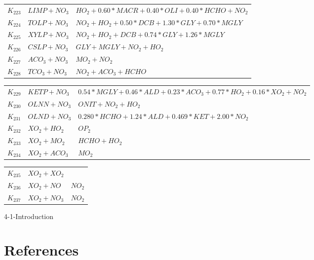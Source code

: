 {\begin{tabular}{l@{\,:\,}p{0.2\chfwidth}@{$\quad\longrightarrow\quad$}p{0.6\chfwidth}}
$K_{223}$ & $LIMP+NO_{3}$ & $HO_{2}+0.60*MACR+0.40*OLI+0.40*HCHO+NO_{2}$ \\
$K_{224}$ & $TOLP+NO_{3}$ & $NO_{2}+HO_{2}+0.50*DCB+1.30*GLY+0.70*MGLY$ \\
$K_{225}$ & $XYLP+NO_{3}$ & $NO_{2}+HO_{2}+DCB+0.74*GLY+1.26*MGLY$ \\
$K_{226}$ & $CSLP+NO_{3}$ & $GLY+MGLY+NO_{2}+HO_{2}$ \\
$K_{227}$ & $ACO_{3}+NO_{3}$ & $MO_{2}+NO_{2}$ \\
$K_{228}$ & $TCO_{3}+NO_{3}$ & $NO_{2}+ACO_{3}+HCHO$ \\
\end{tabular}

\begin{tabular}{l@{\,:\,}p{0.2\chfwidth}@{$\quad\longrightarrow\quad$}p{0.6\chfwidth}}
$K_{229}$ & $KETP+NO_{3}$ & $0.54*MGLY+0.46*ALD+0.23*ACO_{3}+0.77*HO_{2}+0.16*XO_{2}+NO_{2}$ \\
$K_{230}$ & $OLNN+NO_{3}$ & $ONIT+NO_{2}+HO_{2}$ \\
$K_{231}$ & $OLND+NO_{3}$ & $0.280*HCHO+1.24*ALD+0.469*KET+2.00*NO_{2}$ \\
$K_{232}$ & $XO_{2}+HO_{2}$ & $OP_{2}$ \\
$K_{233}$ & $XO_{2}+MO_{2}$ & $HCHO+HO_{2}$ \\
$K_{234}$ & $XO_{2}+ACO_{3}$ & $MO_{2}$ \\
\end{tabular}

\begin{tabular}{l@{\,:\,}p{0.2\chfwidth}@{$\quad\longrightarrow\quad$}p{0.6\chfwidth}}
$K_{235}$ & $XO_{2}+XO_{2}$ &  \\
$K_{236}$ & $XO_{2}+NO$ & $NO_{2}$ \\
$K_{237}$ & $XO_{2}+NO_{3}$ & $NO_{2}$
\end{tabular}
}
%
%
%
\begin{btSect}{4-1-Introduction}
\section{References}
\btPrintCited
\end{btSect}
